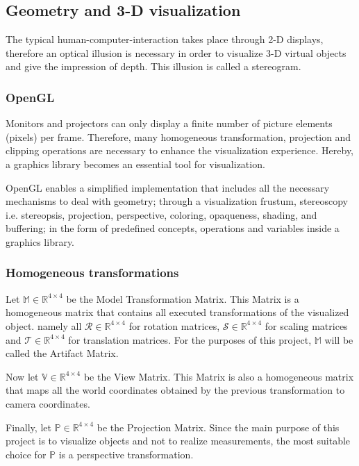 \documentclass[12pt]{extarticle}
\newcommand{\R}{\mathbb{R}}
\newcommand{\Ro}{\mathcal{R}}
\newcommand{\Sc}{\mathcal{S}}
\newcommand{\Tr}{\mathcal{T}}
\newcommand{\Mod}{\mathbb{M}}
\newcommand{\Pro}{\mathbb{P}}
\newcommand{\Vie}{\mathbb{V}}
\begin{document}
\subsection {Geometry and 3-D visualization}\label{subsec: geo}
The typical human-computer-interaction takes place through 2-D displays, therefore an optical illusion is necessary in order to visualize 3-D virtual objects and give the impression of depth. This illusion is called a stereogram.

\subsubsection {OpenGL}\label{subsec{OGL}}
Monitors and projectors can only display a finite number of picture elements (pixels) per frame. Therefore, many homogeneous transformation, projection and clipping operations are necessary to enhance the visualization experience. Hereby, a graphics library becomes an essential tool for visualization.

OpenGL enables a simplified implementation that includes all the necessary mechanisms to deal with geometry; through a visualization frustum, stereoscopy i.e. stereopsis, projection, perspective, coloring, opaqueness, shading, and buffering; in the form of predefined concepts, operations and variables inside a graphics library.

\subsubsection {Homogeneous transformations}\label{subsubsec Hom}
Let $\Mod\in \R ^{4\times 4}$ be the Model Transformation Matrix. This Matrix is a homogeneous matrix that contains all executed transformations of the visualized object. namely all $\Ro \in \R ^{4\times 4}$ for rotation matrices, $\Sc \in \R ^{4\times 4}$ for scaling matrices and $\Tr \in \R ^{4\times 4}$ for translation matrices. For the purposes of this project, $\Mod$ will be called the Artifact Matrix.\cite{RST}

Now let $\Vie\in \R ^{4\times 4}$ be the View Matrix. This Matrix is also a homogeneous matrix that maps all the world coordinates obtained by the previous transformation to camera coordinates.

Finally, let $\Pro\in \R ^{4\times 4}$ be the Projection Matrix. Since the main purpose of this project is to visualize objects and not to realize measurements, the most suitable choice for $\Pro$ is a perspective transformation.
\end{document}
